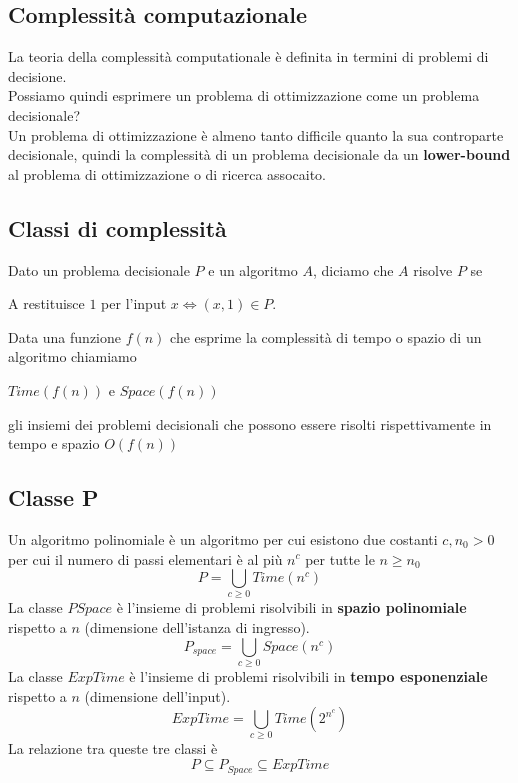 \documentclass{article}
\begin{document}
\subsection*{Complessità computazionale}
La teoria della complessità computationale è definita in termini di problemi di decisione. \\
Possiamo quindi esprimere un problema di ottimizzazione come un problema decisionale? \\
Un problema di ottimizzazione è almeno tanto difficile quanto la sua controparte decisionale, quindi la complessità di un problema decisionale da un \textbf{lower-bound} al problema di ottimizzazione o di ricerca assocaito.

\subsection{Classi di complessità}
Dato un problema decisionale \(P\) e un algoritmo \(A\), diciamo che \(A\) risolve \(P\) se
\begin{center}
  A restituisce \(1\) per l'input \(x \iff (x,1) \in P\).  
\end{center}
Data una funzione \(f(n)\) che esprime la complessità di tempo o spazio di un algoritmo chiamiamo
\begin{center}
  \(Time(f(n))\) e \(Space(f(n))\)
\end{center}
gli insiemi dei problemi decisionali che possono essere risolti rispettivamente in tempo e spazio \(O(f(n))\)
\subsection*{Classe P}
Un algoritmo polinomiale è un algoritmo per cui esistono due costanti \(c,n_0 > 0\) per cui il numero di passi elementari è al più \(n^c\) per tutte le \(n \geq n_0\)
\[P = \bigcup_{c\geq0} Time(n^c)\]
La classe \(PSpace\) è l'insieme di problemi risolvibili in \textbf{spazio polinomiale} rispetto a \(n\) (dimensione dell'istanza di ingresso).
\[P_{space} = \bigcup_{c\geq0} Space(n^c)\]
La classe \(ExpTime\) è l'insieme di problemi risolvibili in \textbf{tempo esponenziale} rispetto a \(n\) (dimensione dell'input).
\[ExpTime = \bigcup_{c\geq0} Time(2^{n^c})\]
La relazione tra queste tre classi è
\[P \subseteq P_{Space} \subseteq ExpTime\]

\end{document}
